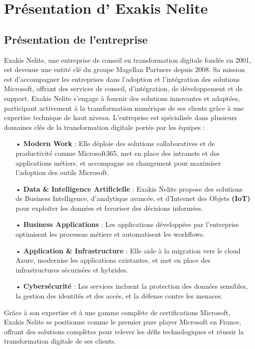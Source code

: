 \section{Présentation d’ Exakis Nelite}
\subsection{Présentation de l'entreprise}

Exakis Nelite, une entreprise de conseil en transformation digitale fondée en 2001, est devenue une entité clé du groupe Magellan Partners depuis 2008. Sa mission est d’accompagner les entreprises dans l’adoption et l’intégration des solutions Microsoft, offrant des services de conseil, d’intégration, de développement et de support. Exakis Nelite s’engage à fournir des solutions innovantes et adaptées, participant activement à la transformation numérique de ses clients grâce à une expertise technique de haut niveau. L'entreprise est spécialisée dans plusieurs domaines clés de la transformation digitale portés par les équipes :
\begin{itemize}
    \item[•] \textbf{Modern Work} : Elle déploie des solutions collaboratives et de productivité comme Microsoft365, met en place des intranets et des applications métiers, et accompagne au changement pour maximiser l’adoption des outils Microsoft.
    \item[•] \textbf{Data \& Intelligence Artificielle} : Exakis Nelite propose des solutions de Business Intelligence, d’analytique avancée, et d’Internet des Objets \textbf{(IoT)} pour exploiter les données et favoriser des décisions informées.
    \item[•] \textbf{Business Applications} : Les applications développées par l'entreprise optimisent les processus métiers et automatisent les workflows.
    \item[•] \textbf{Application \& Infrastructure} : Elle aide à la migration vers le cloud Azure, modernise les applications existantes, et met en place des infrastructures sécurisées et hybrides.
    \item[•] \textbf{Cybersécurité} : Les services incluent la protection des données sensibles, la gestion des identités et des accès, et la défense contre les menaces.
\end{itemize}

\vspace{0.3cm}

Grâce à son expertise et à une gamme complète de certifications Microsoft, Exakis Nelite se positionne comme le premier pure player Microsoft en France, offrant des solutions complètes pour relever les défis technologiques et réussir la transformation digitale de ses clients.

